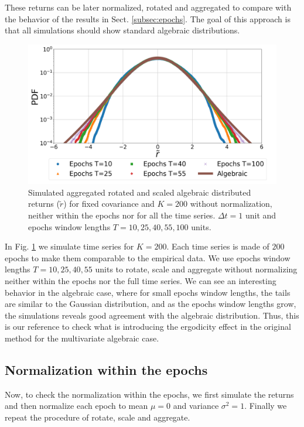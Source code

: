 These returns can be later normalized, rotated and aggregated to compare with
the behavior of the results in Sect. \ref{subsec:epochs}.  The goal of this
approach is that all simulations should show standard algebraic distributions.

\begin{figure}[htbp]
    \centering
    \includegraphics[width=0.6\columnwidth]
    {figures/06_epochs_sim_alg_agg_ret_pairs_no_norm.png}
    \caption{Simulated aggregated rotated and scaled algebraic distributed
             returns ($\tilde{r}$) for fixed covariance and $K=200$ without
             normalization, neither within the epochs nor for all the time
             series. $\Delta t = 1$ unit and epochs window  lengths
             $T=10, 25, 40, 55, 100$ units.}
    \label{fig:alg_epochs_agg_ret_pairs_no_norm}
\end{figure}

In Fig. \ref{fig:alg_epochs_agg_ret_pairs_no_norm} we simulate time series for
$K = 200$. Each time series is made of $200$ epochs to make them comparable
to the empirical data. We use epochs window lengths $T = 10, 25, 40, 55$ units
to rotate, scale and aggregate without normalizing neither within the epochs
nor the full time series. We can see an interesting behavior in the algebraic
case, where for small epochs window lengths, the tails are similar to the
Gaussian distribution, and as the epochs window lengths grow, the simulations
reveals good agreement with the algebraic distribution. Thus, this is our
reference to check what is introducing the ergodicity effect in the original
method for the multivariate algebraic case.

\subsection{Normalization within the epochs}
\label{subsec:norm_epochs_sim}

Now, to check the normalization within the epochs, we first simulate the
returns and then normalize each epoch to mean $\mu = 0$ and variance
$\sigma^{2} = 1$. Finally we repeat the procedure of rotate, scale and
aggregate.

